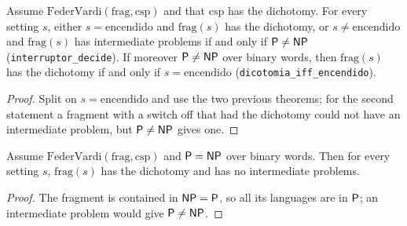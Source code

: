 \begin{theorem}
  \label{thm:structure-interruptor-decide}
  \leanok
  Assume $\mathrm{FederVardi}(\mathrm{frag}, \mathrm{csp})$ and that $\mathrm{csp}$ has the dichotomy.
  For every setting $s$, either $s = \mathrm{encendido}$ and $\mathrm{frag}(s)$ has the dichotomy, or $s
  \neq \mathrm{encendido}$ and $\mathrm{frag}(s)$ has intermediate problems if and only if $\mathsf{P} \neq
  \mathsf{NP}$ (\texttt{interruptor\_decide}). If moreover $\mathsf{P} \neq \mathsf{NP}$ over binary words, then
  $\mathrm{frag}(s)$ has the dichotomy if and only if $s = \mathrm{encendido}$
  (\texttt{dicotomia\_iff\_encendido}).
  \own{}
\end{theorem}

\begin{proof}
  \leanok
  Split on $s = \mathrm{encendido}$ and use the two previous theorems; for the second statement a
  fragment with a switch off that had the dichotomy could not have an intermediate problem, but
  $\mathsf{P} \neq \mathsf{NP}$ gives one.
\end{proof}

\begin{theorem}[If $\cP = \cNP$, every fragment has the dichotomy and none has intermediate problems]
  \label{thm:structure-todos-dicotomia}
  \leanok
  Assume $\mathrm{FederVardi}(\mathrm{frag}, \mathrm{csp})$ and $\cP = \cNP$ over binary words. Then
  for every setting $s$, $\mathrm{frag}(s)$ has the dichotomy and has no intermediate problems.
  \own{}
\end{theorem}

\begin{proof}
  \leanok
  The fragment is contained in $\mathsf{NP} = \mathsf{P}$, so all its languages are in $\mathsf{P}$; an intermediate
  problem would give $\mathsf{P} \neq \mathsf{NP}$.
\end{proof}

